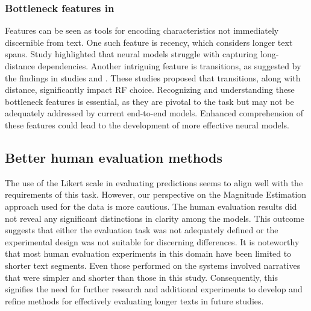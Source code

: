 \subsubsection{Bottleneck features in \context} 
Features can be seen as tools for encoding characteristics not immediately discernible from text. One such feature is recency, which considers longer text spans. Study \studG highlighted that neural models struggle with capturing long-distance dependencies. Another intriguing feature is transitions, as suggested by the findings in studies \studC and \studE. These studies proposed that transitions, along with distance, significantly impact RF choice. Recognizing and understanding these bottleneck features is essential, as they are pivotal to the task but may not be adequately addressed by current end-to-end models. Enhanced comprehension of these features could lead to the development of more effective neural models.

\subsection{Better human evaluation methods}
The use of the Likert scale in evaluating \webnlg predictions seems to align well with the requirements of this task. However, our perspective on the Magnitude Estimation approach used for the \wsj data is more cautious. The human evaluation results did not reveal any significant distinctions in clarity among the models. This outcome suggests that either the evaluation task was not adequately defined or the experimental design was not suitable for discerning differences. It is noteworthy that most human evaluation experiments in this domain have been limited to shorter text segments. Even those performed on the  systems \citep{belz2010generating} involved narratives that were simpler and shorter than those in this study. Consequently, this signifies the need for further research and additional experiments to develop and refine methods for effectively evaluating longer texts in future studies.

